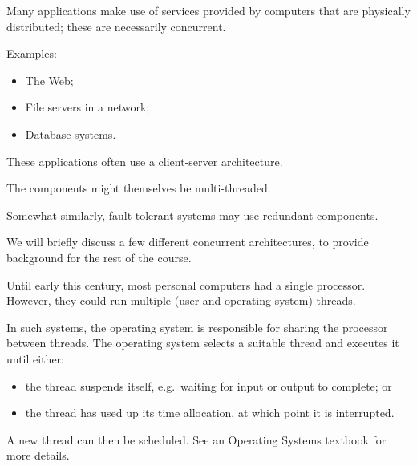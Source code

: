 \documentclass[notes,color]{sepslide0}
\begin{document}
\begin{slide}

Many applications make use of services provided by computers that are
physically distributed; these are necessarily concurrent.

Examples:
%
\begin{itemize}
\item 
The Web;

\item
File servers in a network;

\item
Database systems.
\end{itemize}

These applications often use a client-server architecture.

The components might themselves be multi-threaded.

Somewhat similarly, fault-tolerant systems may use redundant components.
\end{slide}


\begin{slide}

We will briefly discuss a few different concurrent architectures, to provide
background for the rest of the course.
\end{slide}


\begin{slide}

Until early this century, most personal computers had a single processor.
However, they could run multiple (user and operating system) threads.

In such systems, the operating system is responsible for sharing the processor
between threads.  The operating system selects a suitable thread and
executes it until either:
\begin{itemize}
\item
the thread suspends itself, e.g.~waiting for input or output to complete; or

\item
the thread has used up its time allocation, at which point it is interrupted.
\end{itemize}
%
A new thread can then be scheduled.  See an Operating Systems textbook for
more details.
\end{slide}
\end{document}
